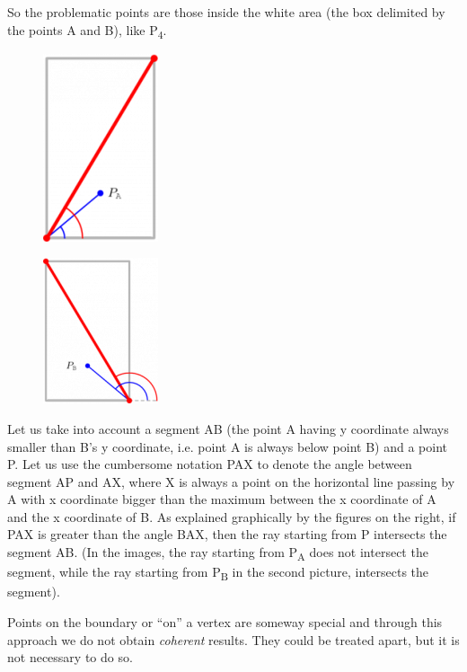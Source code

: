 So the problematic points are those inside the white area (the box
delimited by the points A and B), like P\textsubscript{4}.

\begin{figure}[H]
  \centering
   \includegraphics[scale=.6]{graphics/128px-Posslope.png}
\end{figure}



\begin{figure}[H]
  \centering
   \includegraphics[scale=.6]{graphics/128px-Negslope.png}
\end{figure}


Let us take into account a segment AB (the point A having y coordinate
always smaller than B's y coordinate, i.e. point A is always below point
B) and a point P. Let us use the cumbersome notation PAX to denote the
angle between segment AP and AX, where X is always a point on the
horizontal line passing by A with x coordinate bigger than the maximum
between the x coordinate of A and the x coordinate of B. As explained
graphically by the figures on the right, if PAX is greater than the
angle BAX, then the ray starting from P intersects the segment AB. (In
the images, the ray starting from P\textsubscript{A} does not intersect
the segment, while the ray starting from P\textsubscript{B} in the
second picture, intersects the segment).

Points on the boundary or ``on'' a vertex are someway special and
through this approach we do not obtain \emph{coherent} results. They
could be treated apart, but it is not necessary to do so.


